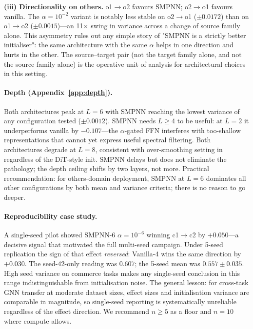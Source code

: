 \documentclass{article}
\begin{document}
\textbf{(iii) Directionality on others.} o1$\to$o2 favours SMPNN; o2$\to$o1 favours vanilla. The $\alpha{=}10^{-2}$ variant is notably less stable on o2$\to$o1 ($\pm 0.0172$) than on o1$\to$o2 ($\pm 0.0015$)---an 11$\times$ swing in variance across a change of source family alone. This asymmetry rules out any simple story of "SMPNN is a strictly better initialiser": the same architecture with the same $\alpha$ helps in one direction and hurts in the other. The source--target pair (not the target family alone, and not the source family alone) is the operative unit of analysis for architectural choices in this setting.

\paragraph{Depth (Appendix~\ref{app:depth}).}
Both architectures peak at $L{=}6$ with SMPNN reaching the lowest variance of any configuration tested ($\pm 0.0012$). SMPNN needs $L{\geq}4$ to be useful: at $L{=}2$ it underperforms vanilla by $-0.107$---the $\alpha$-gated FFN interferes with too-shallow representations that cannot yet express useful spectral filtering. Both architectures degrade at $L{=}8$, consistent with over-smoothing setting in regardless of the DiT-style init. SMPNN delays but does not eliminate the pathology; the depth ceiling shifts by two layers, not more. Practical recommendation: for others-domain deployment, SMPNN at $L{=}6$ dominates all other configurations by both mean and variance criteria; there is no reason to go deeper.

\paragraph{Reproducibility case study.}
A single-seed pilot showed SMPNN-6 $\alpha{=}10^{-6}$ winning c1$\to$c2 by $+0.050$---a decisive signal that motivated the full multi-seed campaign. Under 5-seed replication the sign of that effect \emph{reversed}: Vanilla-4 wins the same direction by $+0.030$. The seed-42-only reading was $0.607$; the 5-seed mean was $0.557 \pm 0.035$. High seed variance on commerce tasks makes any single-seed conclusion in this range indistinguishable from initialisation noise. The general lesson: for cross-task GNN transfer at moderate dataset sizes, effect sizes and initialisation variance are comparable in magnitude, so single-seed reporting is systematically unreliable regardless of the effect direction. We recommend $n\!\ge\!5$ as a floor and $n{=}10$ where compute allows.
\end{document}
